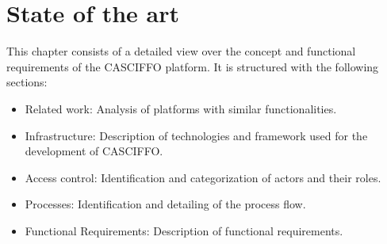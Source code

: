 % 
%
\chapter{State of the art}\label{ch:state-of-the-art}

This chapter consists of a detailed view over the concept and functional requirements of the CASCIFFO platform.
It is structured with the following sections:
\begin{itemize}
    \item Related work: Analysis of platforms with similar functionalities.
    \item Infrastructure: Description of technologies and framework used for the development of CASCIFFO. 
    \item Access control: Identification and categorization of actors and their roles.
    \item Processes: Identification and detailing of the process flow.
    \item Functional Requirements: Description of functional requirements.
\end{itemize}

